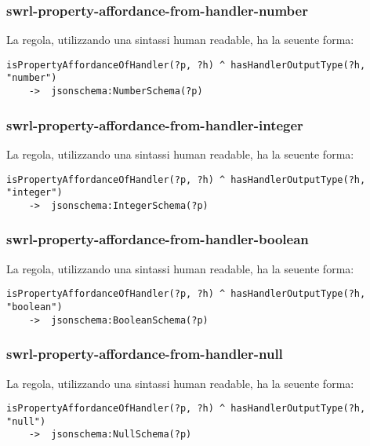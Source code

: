 \subsubsection{swrl-property-affordance-from-handler-number}
La regola, utilizzando una sintassi human readable, ha la seuente forma:
\begin{verbatim}
isPropertyAffordanceOfHandler(?p, ?h) ^ hasHandlerOutputType(?h, "number")
	->  jsonschema:NumberSchema(?p)
\end{verbatim}

\subsubsection{swrl-property-affordance-from-handler-integer}
La regola, utilizzando una sintassi human readable, ha la seuente forma:
\begin{verbatim}
isPropertyAffordanceOfHandler(?p, ?h) ^ hasHandlerOutputType(?h, "integer")
	->  jsonschema:IntegerSchema(?p)
\end{verbatim}

\subsubsection{swrl-property-affordance-from-handler-boolean}
La regola, utilizzando una sintassi human readable, ha la seuente forma:
\begin{verbatim}
isPropertyAffordanceOfHandler(?p, ?h) ^ hasHandlerOutputType(?h, "boolean")
	->  jsonschema:BooleanSchema(?p)
\end{verbatim}

\subsubsection{swrl-property-affordance-from-handler-null}
La regola, utilizzando una sintassi human readable, ha la seuente forma:
\begin{verbatim}
isPropertyAffordanceOfHandler(?p, ?h) ^ hasHandlerOutputType(?h, "null")
	->  jsonschema:NullSchema(?p)
\end{verbatim}

